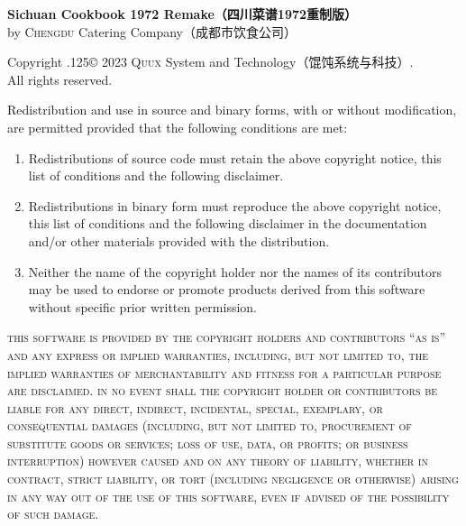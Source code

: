 \begingroup%

\newcommand\XeLaTeX{%
	X\kern-.1em\lower.5ex\hbox{\scalebox{-1}[1]{E}}\kern-.15em%
	L\kern-.36em\raise.428571ex\hbox{\scalefont{.7}{A}}\kern-.15em%
	T\kern-.166667em\lower.5ex\hbox{E}\kern-.125em{X}%
}

\footnotesize%
\singlespacing%
\setlength{\parindent}{0pt}%
\setlength{\parskip}{.1875\baselineskip}%
{\sffamily\bfseries Sichuan Cookbook 1972 Remake\!（四川菜谱1972重制版）}\\%
by \textsc{Chengdu} Catering Company\!（成都市饮食公司）

\null

Copyright {\lower.125\baselineskip\hbox{\copyright}} 2023
\textsc{Quux} System and Technology\!（馄饨系统与科技）\!\!\!.\\%
All rights reserved.

Redistribution and use in source and binary forms, with or without
modification, are permitted provided that the following conditions are met:

\begin{enumerate}
\item Redistributions of source code must retain the above copyright notice,
      this list of conditions and the following disclaimer.

\item Redistributions in binary form must reproduce the above copyright notice,
      this list of conditions and the following disclaimer in the documentation
      and\slash or other materials provided with the distribution.

\item Neither the name of the copyright holder nor the names of its
      contributors may be used to endorse or promote products derived from
      this software without specific prior written permission.
\end{enumerate}

\begingroup%
%
\textsc{this software is provided by the copyright holders and contributors
``as is'' and any express or implied warranties, including, but not limited to,
the implied warranties of merchantability and fitness for a particular purpose
are disclaimed. in no event shall the copyright holder or contributors be
liable for any direct, indirect, incidental, special, exemplary, or
consequential damages (including, but not limited to, procurement of
substitute goods or services; loss of use, data, or profits; or business
interruption) however caused and on any theory of liability, whether in
contract, strict liability, or tort (including negligence or otherwise)
arising in any way out of the use of this software, even if advised of the
possibility of such damage.}


